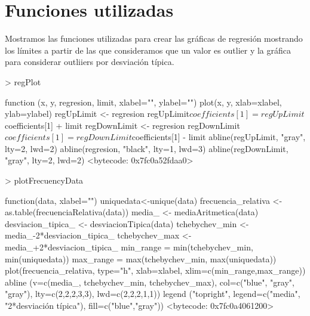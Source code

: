 \documentclass [a4paper] {article}
\begin{document}
\section{Funciones utilizadas}
Mostramos las funciones utilizadas para crear las gráficas de regresión mostrando los límites a partir de las que consideramos que un valor es outlier y la gráfica para considerar outliiers por desviación típica.
\begin{Schunk}
\begin{Sinput}
> regPlot
\end{Sinput}
\begin{Soutput}
function (x, y, regresion, limit, xlabel="", ylabel="") {
  plot(x, y, xlab=xlabel, ylab=ylabel)
  regUpLimit <- regresion
  regUpLimit$coefficients[1] = regUpLimit$coefficients[1] + limit
  regDownLimit <- regresion
  regDownLimit$coefficients[1] = regDownLimit$coefficients[1] - limit
  abline(regUpLimit, "gray", lty=2, lwd=2)
  abline(regresion, "black", lty=1, lwd=3)
  abline(regDownLimit, "gray", lty=2, lwd=2)
}
<bytecode: 0x7fc0a52fdaa0>
\end{Soutput}
\begin{Sinput}
> plotFrecuencyData
\end{Sinput}
\begin{Soutput}
function(data, xlabel="") {
  uniquedata<-unique(data)
  frecuencia_relativa <- as.table(frecuenciaRelativa(data))
  media_ <- mediaAritmetica(data)
  desviacion_tipica_ <- desviacionTipica(data)
  tchebychev_min <- media_-2*desviacion_tipica_
  tchebychev_max <- media_+2*desviacion_tipica_
  min_range = min(tchebychev_min, min(uniquedata))
  max_range = max(tchebychev_min, max(uniquedata))
  plot(frecuencia_relativa, type="h", xlab=xlabel, xlim=c(min_range,max_range))
  abline (v=c(media_, tchebychev_min, tchebychev_max), 
          col=c("blue", "gray", "gray"), lty=c(2,2,2,3,3),
          lwd=c(2,2,2,1,1))
  legend ("topright", legend=c("media", "2*desviación típica"),
          fill=c("blue","gray"))
}
<bytecode: 0x7fc0a4061200>
\end{Soutput}
\end{Schunk}
\end{document}
